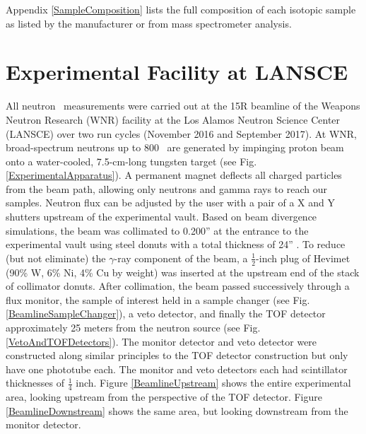 Appendix \ref{SampleComposition} lists the full composition of each isotopic
sample as listed by the manufacturer or from mass spectrometer analysis.

\section{Experimental Facility at LANSCE}
All neutron \tot\ measurements were carried out at the 15R
beamline of the Weapons Neutron Research (WNR) facility at the Los Alamos
Neutron Science Center (LANSCE) over two run cycles (November 2016 and
September 2017). At WNR, broad-spectrum neutrons up
to 800 \mega\electronvolt\ are generated by impinging proton beam onto a water-cooled, 7.5-cm-long
tungsten target (see Fig. \ref{ExperimentalApparatus}). A 
permanent magnet deflects all charged particles from the beam path, 
allowing only neutrons and gamma rays to reach our samples. Neutron flux can be
adjusted by the user with a pair of a X and Y shutters upstream of the
experimental vault. Based on beam divergence
simulations, the beam was collimated to 0.200'' at  the entrance to the
experimental vault using steel donuts with a total thickness of 24'' .
To reduce (but not eliminate) the $\gamma$-ray component of the beam,
a $\frac{1}{2}$-inch plug of Hevimet (90\% W, 6\% 
Ni, 4\% Cu by weight) was inserted at the upstream end of the
stack of collimator donuts. After collimation, the beam passed successively through a flux 
monitor, the sample of interest held in a sample changer (see Fig.
\ref{BeamlineSampleChanger}), a veto detector, and finally the 
TOF detector approximately 25 meters from the neutron source (see Fig.
\ref{VetoAndTOFDetectors}). The monitor detector and veto detector
were constructed along similar principles to the TOF
detector construction but only have one phototube each. The monitor and
veto detectors each had scintillator thicknesses of $\frac{1}{4}$ inch.
Figure \ref{BeamlineUpstream} shows the entire experimental area, looking upstream
from the perspective of the TOF
detector. Figure \ref{BeamlineDownstream} shows the same area, but looking
downstream from the monitor detector.
